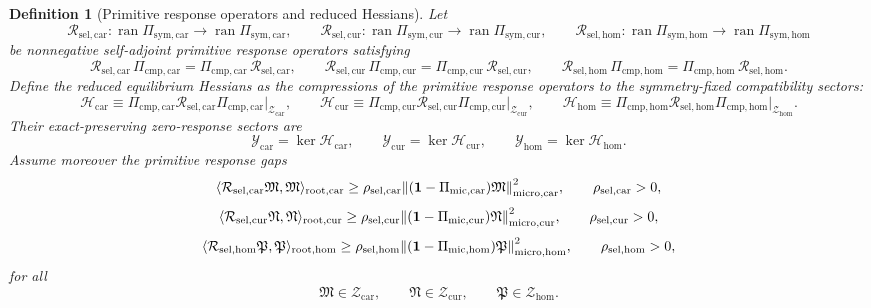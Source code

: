 \documentclass[11pt]{article}
\newcommand{\ProtoTensorClass}{\mathscr Y_{\mathrm{car}}}
\newcommand{\ProtoRelabelClass}{\mathscr Y_{\mathrm{cur}}}
\newcommand{\ProtoFreeClass}{\mathscr Y_{\mathrm{hom}}}
\newcommand{\UltraTensorClass}{\mathscr Z_{\mathrm{car}}}
\newcommand{\UltraRelabelClass}{\mathscr Z_{\mathrm{cur}}}
\newcommand{\UltraFreeClass}{\mathscr Z_{\mathrm{hom}}}
\newcommand{\UltraTensor}{\mathfrak M}
\newcommand{\UltraRelabel}{\mathfrak N}
\newcommand{\UltraFree}{\mathfrak P}
\newcommand{\UltraCarProj}{\Pi_{\mathrm{mic,car}}}
\newcommand{\UltraCurProj}{\Pi_{\mathrm{mic,cur}}}
\newcommand{\UltraHomProj}{\Pi_{\mathrm{mic,hom}}}
\newcommand{\TensorSymProj}{\Pi_{\mathrm{sym,car}}}
\newcommand{\CurSymProj}{\Pi_{\mathrm{sym,cur}}}
\newcommand{\HomSymProj}{\Pi_{\mathrm{sym,hom}}}
\newcommand{\TensorHess}{\mathcal H_{\mathrm{car}}}
\newcommand{\CurHess}{\mathcal H_{\mathrm{cur}}}
\newcommand{\HomHess}{\mathcal H_{\mathrm{hom}}}
\newcommand{\TensorCmpProj}{\Pi_{\mathrm{cmp,car}}}
\newcommand{\CurCmpProj}{\Pi_{\mathrm{cmp,cur}}}
\newcommand{\HomCmpProj}{\Pi_{\mathrm{cmp,hom}}}
\newcommand{\TensorResp}{\mathcal R_{\mathrm{sel,car}}}
\newcommand{\CurResp}{\mathcal R_{\mathrm{sel,cur}}}
\newcommand{\HomResp}{\mathcal R_{\mathrm{sel,hom}}}
\newcommand{\StemCarGap}{\rho_{\mathrm{sel,car}}}
\newcommand{\StemCurGap}{\rho_{\mathrm{sel,cur}}}
\newcommand{\StemHomGap}{\rho_{\mathrm{sel,hom}}}
\newtheorem{definition}{Definition}
\begin{document}
\begin{definition}[Primitive response operators and reduced Hessians]
\label{def:primitive_response}
Let
\[
\TensorResp:\operatorname{ran}\TensorSymProj\to\operatorname{ran}\TensorSymProj,\qquad
\CurResp:\operatorname{ran}\CurSymProj\to\operatorname{ran}\CurSymProj,\qquad
\HomResp:\operatorname{ran}\HomSymProj\to\operatorname{ran}\HomSymProj
\]
be nonnegative self-adjoint primitive response operators satisfying
\begin{equation}
\TensorResp\,\TensorCmpProj=\TensorCmpProj\,\TensorResp,\qquad
\CurResp\,\CurCmpProj=\CurCmpProj\,\CurResp,\qquad
\HomResp\,\HomCmpProj=\HomCmpProj\,\HomResp.
\label{eq:commute_cmp}
\end{equation}
Define the reduced equilibrium Hessians as the compressions of the primitive response operators to the symmetry-fixed compatibility sectors:
\begin{equation}
\TensorHess
\equiv
\TensorCmpProj\TensorResp\TensorCmpProj\Big|_{\UltraTensorClass},
\qquad
\CurHess
\equiv
\CurCmpProj\CurResp\CurCmpProj\Big|_{\UltraRelabelClass},
\qquad
\HomHess
\equiv
\HomCmpProj\HomResp\HomCmpProj\Big|_{\UltraFreeClass}.
\label{eq:hess_from_response}
\end{equation}
Their exact-preserving zero-response sectors are
\begin{equation}
\ProtoTensorClass=\ker\TensorHess,\qquad
\ProtoRelabelClass=\ker\CurHess,\qquad
\ProtoFreeClass=\ker\HomHess.
\label{eq:proto_from_response}
\end{equation}
Assume moreover the primitive response gaps
\begin{equation}
\langle \TensorResp\UltraTensor,\UltraTensor\rangle_{\mathrm{root,car}}
\ge
\StemCarGap\norm{(\mathbf 1-\UltraCarProj)\UltraTensor}_{\mathrm{micro,car}}^2,
\qquad
\StemCarGap>0,
\label{eq:resp_gap_car}
\end{equation}
\begin{equation}
\langle \CurResp\UltraRelabel,\UltraRelabel\rangle_{\mathrm{root,cur}}
\ge
\StemCurGap\norm{(\mathbf 1-\UltraCurProj)\UltraRelabel}_{\mathrm{micro,cur}}^2,
\qquad
\StemCurGap>0,
\label{eq:resp_gap_cur}
\end{equation}
\begin{equation}
\langle \HomResp\UltraFree,\UltraFree\rangle_{\mathrm{root,hom}}
\ge
\StemHomGap\norm{(\mathbf 1-\UltraHomProj)\UltraFree}_{\mathrm{micro,hom}}^2,
\qquad
\StemHomGap>0,
\label{eq:resp_gap_hom}
\end{equation}
for all
\[
\UltraTensor\in\UltraTensorClass,\qquad
\UltraRelabel\in\UltraRelabelClass,\qquad
\UltraFree\in\UltraFreeClass.
\]
\end{definition}
\end{document}
